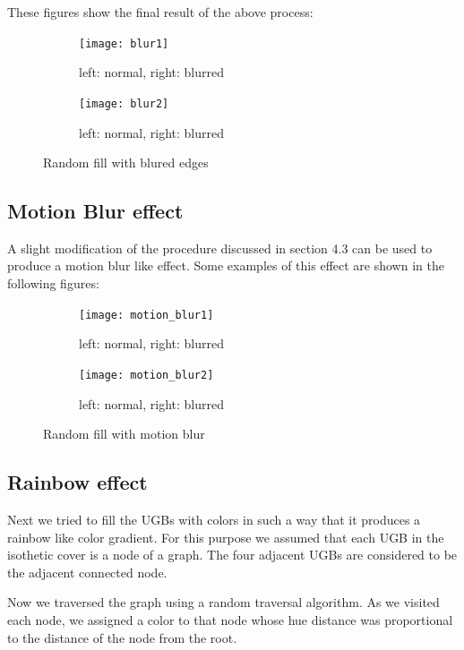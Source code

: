\documentclass[12pt]{article}
\begin{document}
\newpage
These figures show the final result of the above process:

\begin{figure}[H]
	\begin{subfigure}[b]{\textwidth}
		\texttt{[image: blur1]}
		\caption{left: normal, right: blurred}
	\end{subfigure}
	
	\begin{subfigure}[b]{\textwidth}
		\texttt{[image: blur2]}
		\caption{left: normal, right: blurred}
	\end{subfigure}
	\caption{Random fill with blured edges}
	\label{fig:fig_random_fill}
\end{figure}

\vspace{2cm}
\subsection{Motion Blur effect}
A slight modification of the procedure discussed in section 4.3 can be used to produce a motion blur like effect. Some examples of this effect are shown in the following figures:

\begin{figure}[H]
	\begin{subfigure}[b]{\textwidth}
		\texttt{[image: motion\_blur1]}
		\caption{left: normal, right: blurred}
	\end{subfigure}
	
	\begin{subfigure}[b]{\textwidth}
		\texttt{[image: motion\_blur2]}
		\caption{left: normal, right: blurred}
	\end{subfigure}
	\caption{Random fill with motion blur}
	\label{fig:fig_random_fill}
\end{figure}

\vspace{2cm}
\subsection{Rainbow effect}
Next we tried to fill the UGBs with colors in such a way that it produces a rainbow like color gradient. For this purpose we assumed that each UGB in the isothetic cover is a node of a graph. The four adjacent UGBs are considered to be the adjacent connected node.

Now we traversed the graph using a random traversal algorithm. As we visited each node, we assigned a color to that node whose hue distance was proportional to the distance of the node from the root.
\end{document}
